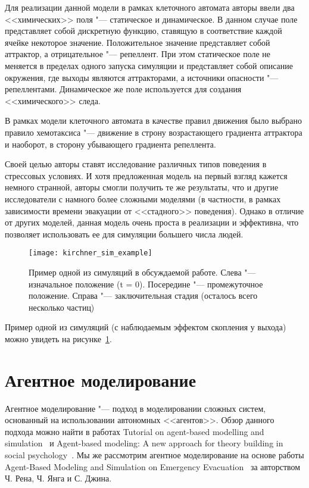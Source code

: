 Для реализации данной модели в рамках клеточного автомата авторы ввели два <<химических>> поля "--- статическое и динамическое.
В данном случае поле представляет собой дискретную функцию, ставящую в соответствие каждой ячейке некоторое значение.
Положительное значение представляет собой аттрактор, а отрицательное "--- репеллент.
При этом статическое поле не меняется в пределах одного запуска симуляции и представляет собой описание окружения,
где выходы являются аттракторами, а источники опасности "--- репеллентами.
Динамическое же поле используется для создания <<химического>> следа.

В рамках модели клеточного автомата в качестве правил движения было выбрано правило хемотаксиса "---
движение в строну возрастающего градиента аттрактора и наоборот, в сторону убывающего градиента репеллента.

Своей целью авторы ставят исследование различных типов поведения в стрессовых условиях.
И хотя предложенная модель на первый взгляд кажется немного странной, авторы смогли получить те же результаты,
что и другие исследователи с намного более сложными моделями (в частности, в рамках зависимости времени эвакуации от <<стадного>> поведения).
Однако в отличие от других моделей, данная модель очень проста в реализации и эффективна, что позволяет использовать ее для симуляции большего числа людей.

\begin{figure}[ht!]
  \centering
  \texttt{[image: kirchner\_sim\_example]}
  \caption{Пример одной из симуляций в обсуждаемой работе. Слева "--- изначальное положение (t = 0). Посередине "--- промежуточное положение. Справа "--- заключительная стадия (осталось всего несколько частиц)}
  \label{sub:overview:kirchner:sim_example}
\end{figure}

Пример одной из симуляций (с наблюдаемым эффектом скопления у выхода) можно увидеть на рисунке~\ref{sub:overview:kirchner:sim_example}.

\section{Агентное моделирование}
\label{sub:overview:agent}

Агентное моделирование "--- подход в моделировании сложных систем, основанный на использовании автономных <<агентов>>. Обзор данного подхода можно найти в работах
Tutorial on agent-based modelling and simulation~\cite{macal2010tutorial} и Agent-based modeling: A new approach for theory building in social psychology~\cite{smith2007agent}.
Мы же рассмотрим агентное моделирование на основе работы Agent-Based Modeling and Simulation on Emergency Evacuation~\cite{ren2009agent} за авторством Ч. Рена, Ч. Янга и С. Джина.

